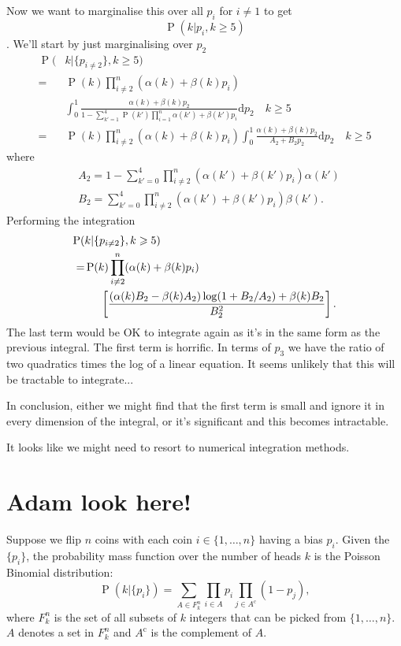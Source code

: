\documentclass[fleqn,usenatbib]{mnras}
\begin{document}
Now we want to marginalise this over all $p_i$ for $i\neq 1$ to get $$\operatorname{P}(k|p_i, k\geq 5)$$. We'll start by just marginalising over $p_2$
\begin{align}
    \operatorname{P}(&k|\{p_{i\neq 2}\}, k\geq 5) \\= &
    \operatorname{P}(k)\prod_{i\neq 2}^n (\alpha(k) + \beta(k)p_i) \nonumber \\&\int_0^1 \frac{\alpha(k) + \beta(k)p_2}
    {1-\sum_{k'=1}^4 \operatorname{P}(k')\prod_{i=1}^n\alpha(k') + \beta(k')p_i} \mathrm{d}p_2\quad k\geq 5 \\= &
    \operatorname{P}(k)\prod_{i\neq 2}^n (\alpha(k) + \beta(k)p_i) \int_0^1 \frac{\alpha(k) + \beta(k)p_2}
    {A_2 + B_2 p_2} \mathrm{d}p_2\quad k\geq 5 
\end{align}
where 
\begin{align}
    &A_2 = 1-\sum_{k'=0}^4 \prod_{i\neq2}^n (\alpha(k') + \beta(k')p_i) \alpha(k')\\ 
    &B_2 = \sum_{k'=0}^4 \prod_{i\neq2}^n (\alpha(k') + \beta(k')p_i) \beta(k'). 
\end{align}
Performing the integration
\begin{align}
    \operatorname{P}(&k|\{p_{i\neq 2}\}, k\geq 5) \\= &
    \operatorname{P}(k)\prod_{i\neq 2}^n(\alpha(k) + \beta(k)p_i) \\ &\hspace{0.5cm} \left[ \frac{(\alpha(k)B_2-\beta(k)A_2)\log(1+B_2/A_2) + \beta(k)B_2}{B_2^2}\right].
\end{align}
The last term would be OK to integrate again as it's in the same form as the previous integral. The first term is horrific. In terms of $p_3$ we have the ratio of two quadratics times the log of a linear equation. It seems unlikely that this will be tractable to integrate...

In conclusion, either we might find that the first term is small and ignore it in every dimension of the integral, or it's significant and this becomes intractable.

It looks like we might need to resort to numerical integration methods.

\section{Adam look here!}

Suppose we flip $n$ coins with each coin $i\in\{1,\dots,n\}$ having a bias $p_i$. Given the $\{p_i\}$, the probability mass function over the number of heads $k$ is the Poisson Binomial distribution:
\begin{equation}
\operatorname{P}(k|\{p_i\}) = \sum_{A\in F_k^n} \prod_{i\in A} p_i \prod_{j\in A^{\mathrm{c}}} (1-p_j),
\end{equation}
where $F_k^n$ is the set of all subsets of $k$ integers that can be picked from $\{1,\dots,n\}$. $A$ denotes a set in $F_k^n$ and $A^{\mathrm{c}}$ is the complement of $A$.
\end{document}
